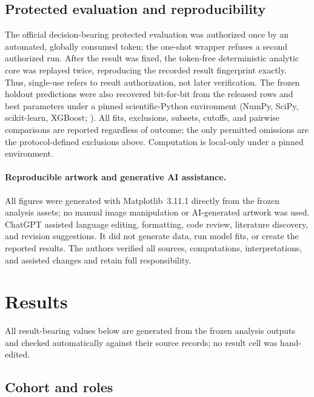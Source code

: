 \documentclass[pdflatex,sn-basic,Numbered]{sn-jnl}
\begin{document}
\subsection{Protected evaluation and reproducibility}\label{sec:oneshot}

The official decision-bearing protected evaluation was authorized once by an
automated, globally consumed token; the one-shot wrapper refuses a second
authorized run. After the result was fixed, the token-free deterministic
analytic core was replayed twice, reproducing the recorded result fingerprint
exactly. Thus, single-use refers to result authorization, not later verification.
The frozen holdout predictions were also recovered bit-for-bit from the released
rows and best parameters under a pinned scientific-Python environment (NumPy,
SciPy, scikit-learn, XGBoost;
\citealp{harris2020numpy,virtanen2020scipy,pedregosa2011sklearn,chen2016xgboost}).
All fits, exclusions, subsets, cutoffs, and pairwise comparisons are reported
regardless of outcome; the only permitted omissions are the protocol-defined
exclusions above.
Computation is local-only under a pinned environment.

\paragraph{Reproducible artwork and generative AI assistance.} All figures were
generated with Matplotlib~3.11.1 directly from the frozen analysis assets; no
manual image manipulation or AI-generated artwork was used. ChatGPT assisted
language editing, formatting, code review, literature discovery, and revision
suggestions. It did not generate data, run model fits, or create the reported
results. The authors verified all sources, computations, interpretations, and
assisted changes and retain full responsibility.

\section{Results}\label{sec:results}

All result-bearing values below are generated from the frozen analysis outputs
and checked automatically against their source records; no result cell was
hand-edited.

\subsection{Cohort and roles}\label{sec:cohort-results}
\end{document}
